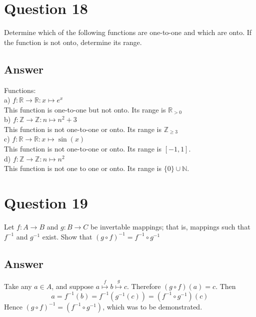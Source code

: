 \documentclass[
	12pt, %
]{fphw}
\newcommand\set[1]{\{#1\}}
\newcommand\qed{\text{$\blacksquare$}}
\newcommand\R{\mathbb{R}}
\newcommand\Z{\mathbb{Z}}
\newcommand\N{\mathbb{N}}
\begin{document}
\section*{Question 18}

\begin{problem}
Determine which of the following functions are one-to-one and which are onto. If the function is not onto, determine its range.
\end{problem}


\subsection*{Answer}
Functions:\\
a) $f : \R \to \R : x \mapsto e^x$ \\
This function is one-to-one but not onto. Its range is $\R _{>0}$\\
b) $f : \Z \to \Z : n \mapsto n^2 + 3$ \\
This function is not one-to-one or onto. Its range is $\Z_{\ge3}$\\
c) $f : \R \to \R : x \mapsto \sin(x)$\\
This function is not one-to-one or onto. Its range is $[-1, 1]$.\\
d) $f : \Z \to \Z : n \mapsto n^2$ \\
This function is not one to one or onto. Its range is $\set{0} \cup \N$.\\

\section*{Question 19}

\begin{problem}
Let $f: A \to B$ and $g: B \to C$ be invertable mappings; that is, mappings such that $f^{-1}$ and $g^{-1}$ exist. Show that $(g \circ f)^{-1} = f^{-1} \circ g^{-1}$ 
\end{problem}


\subsection*{Answer}
Take any $a \in A$, and suppose $a\overset{f}{\mapsto}b\overset{g}{\mapsto}c$. Therefore $(g \circ f)(a) = c$. Then
$$
a = f^{-1}(b) = f^{-1}(g^{-1}(c)) = (f^{-1} \circ g^{-1})(c)
$$
Hence $(g \circ f)^{-1} = (f^{-1} \circ g^{-1})$, which was to be demonstrated. \qed
\end{document}
